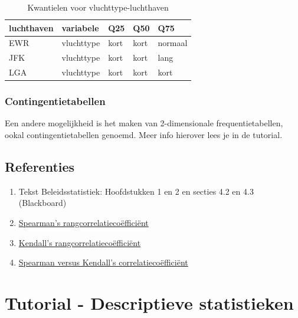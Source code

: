 \documentclass[]{tufte-book}
\providecommand{\tightlist}{%
  \setlength{\itemsep}{0pt}\setlength{\parskip}{0pt}}
\begin{document}
\begin{table}

\caption{\label{tab:unnamed-chunk-75}Kwantielen voor vluchttype-luchthaven}
\centering
\fontsize{10}{12}\selectfont
\begin{tabular}[t]{lllll}
\toprule
luchthaven & variabele & Q25 & Q50 & Q75\\
\midrule
EWR & vluchttype & kort & kort & normaal\\
JFK & vluchttype & kort & kort & lang\\
LGA & vluchttype & kort & kort & kort\\
\bottomrule
\end{tabular}
\end{table}

\hypertarget{contingentietabellen}{%
\subsection*{Contingentietabellen}\label{contingentietabellen}}

Een andere mogelijkheid is het maken van 2-dimensionale frequentietabellen, ookal contingentietabellen genoemd. Meer info hierover lees je in de tutorial.

\hypertarget{referenties-2}{%
\section*{Referenties}\label{referenties-2}}

\begin{enumerate}
\def\labelenumi{\arabic{enumi}.}
\tightlist
\item
  Tekst Beleidsstatistiek: Hoofdstukken 1 en 2 en secties 4.2 en 4.3 (Blackboard)
\item
  \href{https://nl.wikipedia.org/wiki/Spearmans_rangcorrelatieco\%C3\%ABffici\%C3\%ABnt}{Spearman's rangcorrelatiecoëfficiënt}
\item
  \href{https://nl.wikipedia.org/wiki/Kendalls_tau}{Kendall's rangcorrelatiecoëfficiënt}
\item
  \href{https://www.researchgate.net/post/Does_Spearmans_rho_have_any_advantage_over_Kendalls_tau}{Spearman versus Kendall's correlatiecoëfficiënt}
\end{enumerate}

\hypertarget{tutorial---descriptieve-statistieken}{%
\chapter{Tutorial - Descriptieve statistieken}\label{tutorial---descriptieve-statistieken}}
\end{document}
